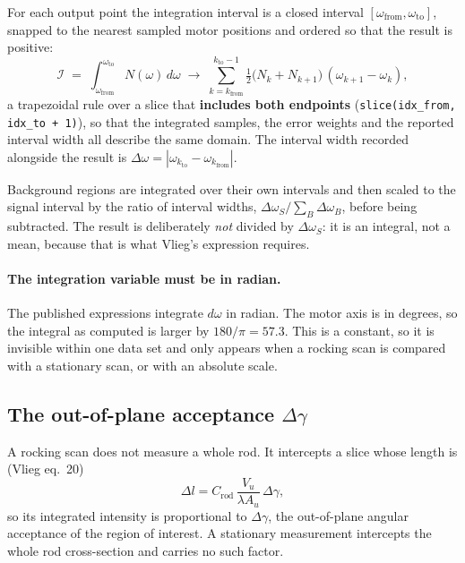 \documentclass[11pt,a4paper]{article}
\newcommand{\dgam}{\Delta\gamma}
\newcommand{\Crod}{C_{\mathrm{rod}}}
\newcommand{\Au}{A_{u}}
\newcommand{\code}[1]{\texttt{\small #1}}
\begin{document}
For each output point the integration interval is a closed interval
$[\omega_{\mathrm{from}}, \omega_{\mathrm{to}}]$, snapped to the nearest
sampled motor positions and ordered so that the result is positive:
\begin{equation}
  \mathcal{I} \;=\; \int_{\omega_{\mathrm{from}}}^{\omega_{\mathrm{to}}}
                     N(\omega)\, d\omega
    \;\longrightarrow\;
    \sum_{k=k_{\mathrm{from}}}^{k_{\mathrm{to}}-1}
      \tfrac{1}{2}\bigl(N_k + N_{k+1}\bigr)\,(\omega_{k+1}-\omega_k) ,
\end{equation}
a trapezoidal rule over a slice that \textbf{includes both endpoints}
(\code{slice(idx\_from, idx\_to + 1)}), so that the integrated samples, the
error weights and the reported interval width all describe the same domain.
The interval width recorded alongside the result is
$\Delta\omega = |\omega_{k_{\mathrm{to}}} - \omega_{k_{\mathrm{from}}}|$.

Background regions are integrated over their own intervals and then scaled to
the signal interval by the ratio of interval widths,
$\Delta\omega_S/\sum_{B}\Delta\omega_B$, before being subtracted. The result
is deliberately \emph{not} divided by $\Delta\omega_S$: it is an integral, not
a mean, because that is what Vlieg's expression requires.

\paragraph{The integration variable must be in radian.} The published
expressions integrate $d\omega$ in radian. The motor axis is in degrees, so
the integral as computed is larger by $180/\pi = 57.3$. This is a constant, so
it is invisible within one data set and only appears when a rocking scan is
compared with a stationary scan, or with an absolute scale.

\subsection{The out-of-plane acceptance $\dgam$}
\label{sec:acceptance}

A rocking scan does not measure a whole rod. It intercepts a slice whose
length is (Vlieg eq.~20)
\begin{equation}
  \Delta l = \Crod \, \frac{V_u}{\lambda \Au}\, \dgam ,
\end{equation}
so its integrated intensity is proportional to $\dgam$, the out-of-plane
angular acceptance of the region of interest. A stationary measurement
intercepts the whole rod cross-section and carries no such factor.
\end{document}
